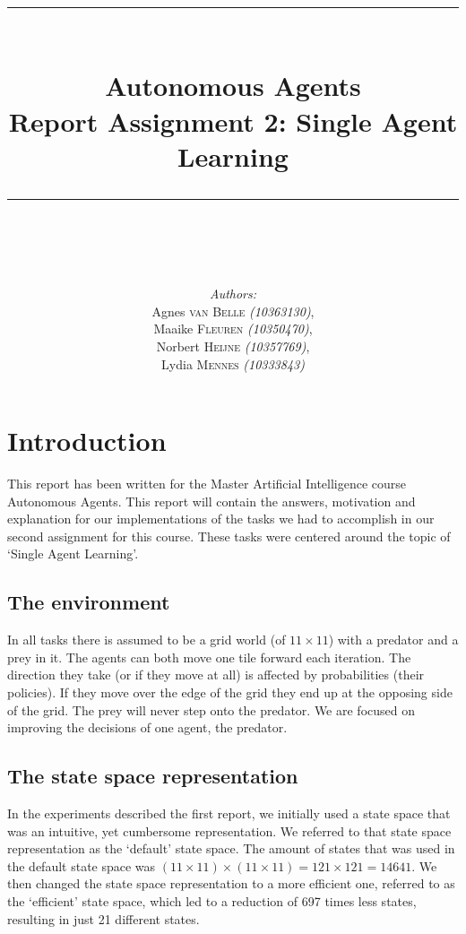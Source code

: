 \documentclass{article}
\newcommand{\HRule}{\rule{\linewidth}{0.1mm}}
\begin{document}
\title{ \HRule \\[0.2cm]
		Autonomous Agents\\ 
		Report Assignment 2: Single Agent Learning\\
		\HRule \\[0.1cm]
		}
		
\author{
		\emph{Authors:}\\[0.2cm]
		Agnes \textsc{van Belle} \small{ \emph{(10363130)}},\\ 
		Maaike \textsc{Fleuren} \small{ \emph{(10350470)}}, \\
		Norbert \textsc{Heijne} \small{ \emph{(10357769)}}, \\
		Lydia \textsc{Mennes} \small{ \emph{(10333843)}}
		}
		
\maketitle

\section{Introduction}
This report has been written for the Master Artificial Intelligence course Autonomous Agents. This report will contain the answers, motivation and explanation for our implementations of the tasks we had to accomplish in our second assignment for this course. These tasks were centered around the topic of `Single Agent Learning'.

\subsection{The environment} \label{environment}
In all tasks there is assumed to be a grid world (of $11 \times 11$) with a predator and a prey in it. The agents can both move one tile forward each iteration. The direction they take (or if they move at all) is affected by probabilities (their policies). If they move over the edge of the grid they end up at the opposing side of the grid. The prey will never step onto the predator. We are focused on improving the decisions of one agent, the predator. 

\subsection{The state space representation} \label{stateSpace}
In the experiments described the first report, we initially used a state space that was an intuitive, yet cumbersome representation. We referred to that state space representation as the `default' state space. The amount of states that was used in the default state space was $(11 \times 11) \times (11 \times 11) = 121 \times 121 = 14641$. We then changed the state space representation to a more efficient one, referred to as the `efficient' state space, which led to a reduction of 697 times less states, resulting in just 21 different states.
\end{document}
